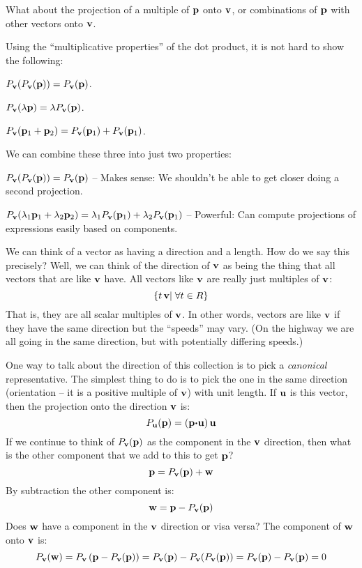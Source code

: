 \documentclass[12pt]{article}
\begin{document}
{What about the projection of a multiple of ${\bf p}$ onto ${\bf v}$, or 
combinations of ${\bf p}$ with other vectors onto ${\bf v}$.

Using the ``multiplicative properties'' of the dot product, 
it is not hard to show the following: 
\bi
  \item{$P_{\bf v}(P_{\bf v}({\bf p})) = P_{\bf v}({\bf p})$.}
  \item{$P_{\bf v}(\lambda {\bf p}) = \lambda P_{\bf v}({\bf p})$.}
  \item{$P_{\bf v}({\bf p}_1 + {\bf p}_2) = P_{\bf v}({\bf p}_1) + P_{\bf v}({\bf p}_1)$.}
\ei

We can combine these three into just two properties:
\bi
  \item{ $P_{\bf v}(P_{\bf v}({\bf p})) = P_{\bf v}({\bf p})$ -- Makes sense: 
      We shouldn't be able to get closer doing a second projection.}
\item{ $P_{\bf v}(\lambda_1 {\bf p}_1 + \lambda_2 {\bf p}_2) = 
    \lambda_1 P_{\bf v}({\bf p}_1) + \lambda_2 P_{\bf v}({\bf p}_1)$ -- 
    Powerful: Can compute projections of expressions easily based on components. }
\ei

We can think of a vector as having a direction and a length. 
How do we say this precisely? Well, we can think of the direction 
of ${\bf v}$ as being the thing that all vectors that are like ${\bf v}$ have. 
All vectors like ${\bf v}$ are really just multiples of ${\bf v}$:
$$ \{ t \, {\bf v} | \; \forall t \in R\} $$
That is, they are all scalar multiples of ${\bf v}$. 
In other words, vectors are like ${\bf v}$ if they have the same direction 
but the ``speeds'' may vary.
(On the highway we are all going in the same direction, but with 
potentially differing speeds.)


One way to talk about the direction of this collection is to 
pick a {\em canonical} representative. The simplest thing to do is to 
pick the one in the same direction (orientation -- it is a positive 
multiple of ${\bf v}$) with unit length.
If ${\bf u}$ is this vector, then the projection onto the direction ${\bf v}$ is:
$$ P_{{\bf u}}({\bf p}) = \left({\bf p} {\boldsymbol \cdot} {\bf u}\right) {\bf u}$$
If we continue to think of $P_{\bf v}({\bf p})$ as the component in the 
${\bf v}$ direction, then what is the other component that we add to this 
to get ${\bf p}$?
$$ {\bf p} = P_{{\bf v}}({\bf p}) + {\bf w} $$
By subtraction the other component is:
$$ {\bf w} = {\bf p} - P_{\bf v}({\bf p}) $$
Does ${\bf w}$ have a component in the ${\bf v}$ direction or visa versa?
The component of ${\bf w}$ onto ${\bf v}$ is:
$$ P_{\bf v}({\bf w}) = P_{\bf v} \left({\bf p} - P_{\bf v}({\bf p})\right) = 
    P_{\bf v}({\bf p}) - P_{\bf v}(P_{\bf v}({\bf p})) = P_{\bf v}({\bf p}) - P_{\bf v}({\bf p}) = 0 $$ 

}
\end{document}
